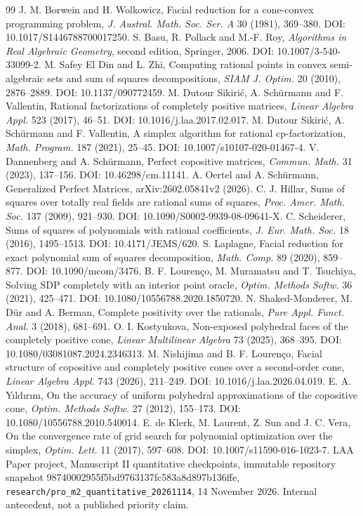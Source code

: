 \begin{thebibliography}{99}
 J. M. Borwein and H. Wolkowicz, Facial reduction for a cone-convex programming problem, \emph{J. Austral. Math. Soc. Ser. A} 30 (1981), 369--380. DOI: 10.1017/S1446788700017250.
 S. Basu, R. Pollack and M.-F. Roy, \emph{Algorithms in Real Algebraic Geometry}, second edition, Springer, 2006. DOI: 10.1007/3-540-33099-2.
 M. Safey El Din and L. Zhi, Computing rational points in convex semi-algebraic sets and sum of squares decompositions, \emph{SIAM J. Optim.} 20 (2010), 2876--2889. DOI: 10.1137/090772459.
 M. Dutour Sikiri\'c, A. Sch\"urmann and F. Vallentin, Rational factorizations of completely positive matrices, \emph{Linear Algebra Appl.} 523 (2017), 46--51. DOI: 10.1016/j.laa.2017.02.017.
 M. Dutour Sikiri\'c, A. Sch\"urmann and F. Vallentin, A simplex algorithm for rational cp-factorization, \emph{Math. Program.} 187 (2021), 25--45. DOI: 10.1007/s10107-020-01467-4.
 V. Dannenberg and A. Sch\"urmann, Perfect copositive matrices, \emph{Commun. Math.} 31 (2023), 137--156. DOI: 10.46298/cm.11141.
 A. Oertel and A. Sch\"urmann, Generalized Perfect Matrices, arXiv:2602.05841v2 (2026).
 C. J. Hillar, Sums of squares over totally real fields are rational sums of squares, \emph{Proc. Amer. Math. Soc.} 137 (2009), 921--930. DOI: 10.1090/S0002-9939-08-09641-X.
 C. Scheiderer, Sums of squares of polynomials with rational coefficients, \emph{J. Eur. Math. Soc.} 18 (2016), 1495--1513. DOI: 10.4171/JEMS/620.
 S. Laplagne, Facial reduction for exact polynomial sum of squares decomposition, \emph{Math. Comp.} 89 (2020), 859--877. DOI: 10.1090/mcom/3476.
 B. F. Louren\c co, M. Muramatsu and T. Tsuchiya, Solving SDP completely with an interior point oracle, \emph{Optim. Methods Softw.} 36 (2021), 425--471. DOI: 10.1080/10556788.2020.1850720.
 N. Shaked-Monderer, M. D\"ur and A. Berman, Complete positivity over the rationals, \emph{Pure Appl. Funct. Anal.} 3 (2018), 681--691.
 O. I. Kostyukova, Non-exposed polyhedral faces of the completely positive cone, \emph{Linear Multilinear Algebra} 73 (2025), 368--395. DOI: 10.1080/03081087.2024.2346313.
 M. Nishijima and B. F. Louren\c co, Facial structure of copositive and completely positive cones over a second-order cone, \emph{Linear Algebra Appl.} 743 (2026), 211--249. DOI: 10.1016/j.laa.2026.04.019.
 E. A. Y\i ld\i r\i m, On the accuracy of uniform polyhedral approximations of the copositive cone, \emph{Optim. Methods Softw.} 27 (2012), 155--173. DOI: 10.1080/10556788.2010.540014.
 E. de Klerk, M. Laurent, Z. Sun and J. C. Vera, On the convergence rate of grid search for polynomial optimization over the simplex, \emph{Optim. Lett.} 11 (2017), 597--608. DOI: 10.1007/s11590-016-1023-7.
 LAA Paper project, Manuscript II quantitative checkpoints, immutable repository snapshot 98740002955f5bd9763137fc583a8d897b136ffe, \texttt{research/pro\_m2\_quantitative\_20261114}, 14 November 2026. Internal antecedent, not a published priority claim.
\end{thebibliography}

